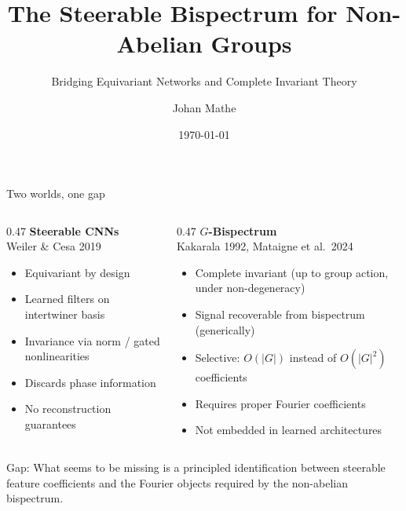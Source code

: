 \documentclass[aspectratio=169]{beamer}
\title{The Steerable Bispectrum for Non-Abelian Groups}
\subtitle{Bridging Equivariant Networks and Complete Invariant Theory}
\author{Johan Mathe}
\date{\today}
\begin{document}
\maketitle

\begin{frame}{Two worlds, one gap}
  \begin{columns}[T]
    \begin{column}{0.47\textwidth}
      \textbf{Steerable CNNs}\\
      {\small Weiler \& Cesa 2019}

      \medskip

      \begin{itemize}\small
        \item Equivariant by design
        \item Learned filters on intertwiner basis
        \item Invariance via \alert{norm / gated nonlinearities}
        \item[$\to$] Discards phase information
        \item[$\to$] No reconstruction guarantees
      \end{itemize}
    \end{column}
    \begin{column}{0.47\textwidth}
      \textbf{$G$-Bispectrum}\\
      {\small Kakarala 1992, Mataigne et al.\ 2024}

      \medskip

      \begin{itemize}\small
        \item Complete invariant (up to group action, under non-degeneracy)
        \item Signal recoverable from bispectrum (generically)
        \item Selective: $O(|G|)$ instead of $O(|G|^2)$ coefficients
        \item[$\to$] Requires \alert{proper Fourier coefficients}
        \item[$\to$] Not embedded in learned architectures
      \end{itemize}
    \end{column}
  \end{columns}

  \bigskip
  \centering
  \alert{Gap}: What seems to be missing is a principled identification between steerable\\
  feature coefficients and the Fourier objects required by the non-abelian bispectrum.
\end{frame}
\end{document}
